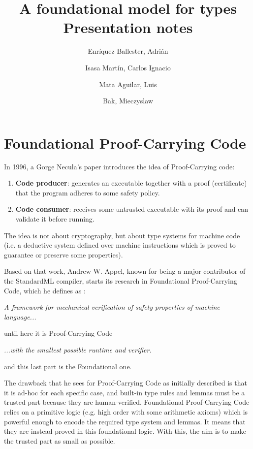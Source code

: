 \documentclass{article}
\title{
  A foundational model for types \\
  \large Presentation notes  
}
\author{
  Enríquez Ballester, Adrián 
  \and
  Isasa Martín, Carlos Ignacio
  \and 
  Mata Aguilar, Luis
  \and 
  Bak, Mieczyslaw
}
\begin{document}
\maketitle

\section*{Foundational Proof-Carrying Code}

In 1996, a Gorge Necula's paper \cite{necula:pcc} 
introduces the idea of Proof-Carrying code:

\begin{enumerate}
  \item \textbf{Code producer}: generates an executable 
    together with a proof (certificate) that the program 
    adheres to some safety policy.
  \item \textbf{Code consumer}: receives some untrusted 
    executable with its proof and can validate it before 
    running.
\end{enumerate}

The idea is not about cryptography, but about type systems 
for machine code (i.e. a deductive system defined over 
machine instructions which is proved to guarantee or 
preserve some properties).

Based on that work, Andrew W. Appel, known for being a 
major contributor of the StandardML compiler, starts its 
research in Foundational Proof-Carrying Code, which he 
defines as \cite{appel:fpcc}:

\begin{center}
\textit{
  A framework for mechanical verification of safety 
  properties of machine language...
}
\end{center}

until here it is Proof-Carrying Code

\begin{center}
\textit{
  ...with the smallest possible runtime and verifier.
}
\end{center}

and this last part is the Foundational one. 

The drawback that he sees for Proof-Carrying Code as 
initially described is that it is ad-hoc for each specific 
case, and built-in type rules and lemmas must be a trusted 
part because they are human-verified. Foundational 
Proof-Carrying Code relies on a primitive logic (e.g. high 
order with some arithmetic axioms) which is powerful 
enough to encode the required type system and lemmas. It 
means that they are instead proved in this foundational 
logic. With this, the aim is to make the trusted part as 
small as possible.
\end{document}
